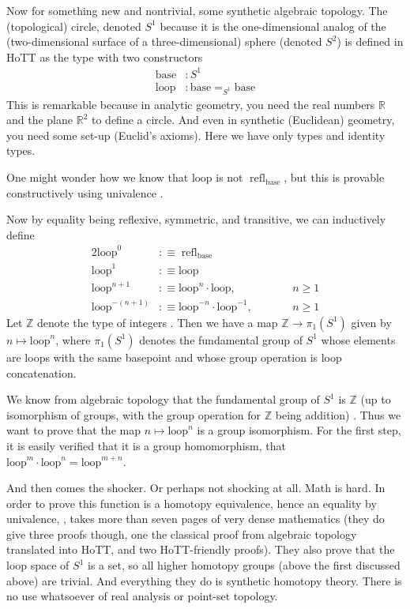 \documentclass[11pt]{article}
\DeclareMathOperator{\refl}{refl}
\newcommand{\sloop}{\text{loop}}
\newcommand{\sbase}{\text{base}}
\newcommand{\ints}{\mathbb{Z}}
\newcommand{\real}{\mathbb{R}}
\begin{document}
Now for something new and nontrivial, some synthetic algebraic topology.
The (topological) circle, denoted $S^1$ because it is the one-dimensional
analog of the (two-dimensional surface of a three-dimensional) sphere
(denoted $S^2$) is defined in HoTT as the type with two constructors
\begin{align*}
   \sbase & : S^1
   \\
   \sloop & : \sbase =_{S^1} \sbase
\end{align*}
This is remarkable because in analytic geometry, you need the real numbers
$\real$ and the plane $\real^2$ to define a circle.  And even in synthetic
(Euclidean) geometry, you need some set-up (Euclid's axioms).
Here we have only types and identity types.

One might wonder how we know that $\sloop$ is not $\refl_\sbase$,
but this is provable constructively using univalence
.

Now by equality being reflexive, symmetric, and transitive, we can
inductively define
\begin{alignat*}{2}
   \sloop^0 & :\equiv \refl_\sbase
   \\
   \sloop^1 & :\equiv \sloop
   \\
   \sloop^{n + 1} & :\equiv \sloop^n \cdot \sloop,
        & \qquad & n \ge 1
   \\
   \sloop^{- (n + 1)} & :\equiv \sloop^{- n} \cdot \sloop^{-1},
        & \qquad & n \ge 1
\end{alignat*}
Let $\ints$ denote the type of integers .  Then we have a map
$\ints \to \pi_1(S^1)$ given by $n \mapsto \sloop^n$, where $\pi_1(S^1)$
denotes the fundamental group of $S^1$ whose elements are loops with the
same basepoint and whose group operation is loop concatenation.

We know from algebraic topology that the fundamental group of $S^1$ is $\ints$
(up to isomorphism of groups, with the group operation for $\ints$ being
addition) .  Thus we want to prove that
the map $n \mapsto \sloop^n$ is a group isomorphism.
For the first step, it is easily verified that it is a group homomorphism,
that $\sloop^m \cdot \sloop^n = \sloop^{m + n}$.

And then comes the shocker.  Or perhaps not shocking at all.  Math is hard.
In order to prove this function is a homotopy equivalence, hence
an equality by univalence,
, takes more than seven pages of very dense
mathematics (they do give three proofs though, one the classical
proof from algebraic topology translated into HoTT,
and two HoTT-friendly proofs).
They also prove that the loop space of $S^1$ is a set, so all higher homotopy
groups (above the first discussed above) are trivial.
And everything they do is synthetic homotopy theory.
There is no use whatsoever of real analysis or point-set topology.
\end{document}
